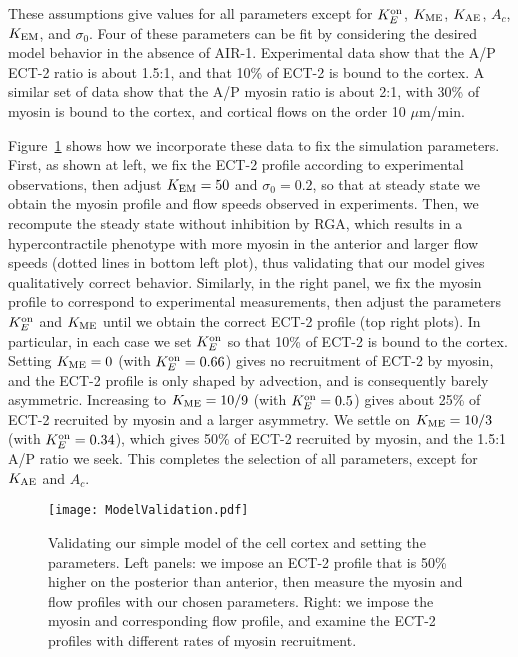 \documentclass[11pt]{article}
\begin{document}
\begin{appendix}
\begin{enumerate}
\end{enumerate}
These assumptions give values for all parameters except for $K^\text{on}_E$, $K_\text{ME}$, $K_\text{AE}$, $A_c$, $K_\text{EM}$, and $\sigma_0$. Four of these parameters can be fit by considering the desired model behavior in the absence of AIR-1. Experimental data \citep[Fig.~1]{longhini2022aurora} show that the A/P ECT-2 ratio is about 1.5:1, and that 10\% of ECT-2 is bound to the cortex. A similar set of data \citep[Figs.~S2,S3]{gross2019guiding} show that the A/P myosin ratio is about 2:1, with 30\% of myosin is bound to the cortex, and cortical flows on the order 10 $\mu$m/min. 

Figure\ \ref{fig:CortexMod} shows how we incorporate these data to fix the simulation parameters. First, as shown at left, we fix the ECT-2 profile according to experimental observations, then adjust $K_\text{EM}=50$ and $\sigma_0=0.2$, so that at steady state we obtain the myosin profile and flow speeds observed in experiments. Then, we recompute the steady state without inhibition by RGA, which results in a hypercontractile phenotype with more myosin in the anterior and larger flow speeds (dotted lines in bottom left plot), thus validating that our model gives qualitatively correct behavior. Similarly, in the right panel, we fix the myosin profile to correspond to experimental measurements, then adjust the parameters $K^\text{on}_E$ and $K_\text{ME}$ until we obtain the correct ECT-2 profile (top right plots). In particular, in each case we set $K^\text{on}_E$ so that 10\% of ECT-2 is bound to the cortex. Setting $K_\text{ME}=0$ (with $K^\text{on}_E=0.66$) gives no recruitment of ECT-2 by myosin, and the ECT-2 profile is only shaped by advection, and is consequently barely asymmetric. Increasing to $K_\text{ME}=10/9$ (with $K^\text{on}_E=0.5$) gives about 25\% of ECT-2 recruited by myosin and a larger asymmetry. We settle on $K_\text{ME}=10/3$ (with $K^\text{on}_E=0.34$), which gives 50\% of ECT-2 recruited by myosin, and the 1.5:1 A/P ratio we seek. This completes the selection of all parameters, except for $K_\text{AE}$ and $A_c$. 

\begin{figure}
\centering
\texttt{[image: ModelValidation.pdf]}
\caption{\label{fig:CortexMod}Validating our simple model of the cell cortex and setting the parameters. Left panels: we impose an ECT-2 profile that is 50\% higher on the posterior than anterior, then measure the myosin and flow profiles with our chosen parameters. Right: we impose the myosin and corresponding flow profile, and examine the ECT-2 profiles with different rates of myosin recruitment.}
\end{figure}


\end{appendix}
\end{document}
